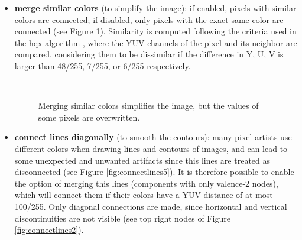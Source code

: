 \documentclass[]{usiinfbachelorproject}
\begin{document}
\begin{itemize}
	\item {\bf merge similar colors} (to simplify the image): if enabled, pixels with similar colors are connected; if disabled, only pixels with the exact same color are connected (see Figure \ref{fig:merge}). Similarity is computed following the criteria used in the hqx algorithm \cite{Stepin2003}, where the YUV channels of the pixel and its neighbor are compared, considering them to be dissimilar if the difference in Y, U, V is larger than 48/255, 7/255, or 6/255 respectively. 
	\begin{figure}[ht]
		\centering
		\\
		\caption{Merging similar colors simplifies the image, but the values of some pixels are overwritten.}
		\label{fig:merge}
	\end{figure}
	\item {\bf connect lines diagonally} (to smooth the contours): many pixel artists use different colors when drawing lines and contours of images, and can lead to some unexpected and unwanted artifacts since this lines are treated as disconnected (see Figure \ref{fig:connectlines5}). It is therefore possible to enable the option of merging this lines (components with only valence-2 nodes), which will connect them if their colors have a YUV distance of at most 100/255. Only diagonal connections are made, since horizontal and vertical discontinuities are not visible (see top right nodes of Figure \ref{fig:connectlines2}).

\end{itemize}
\end{document}
